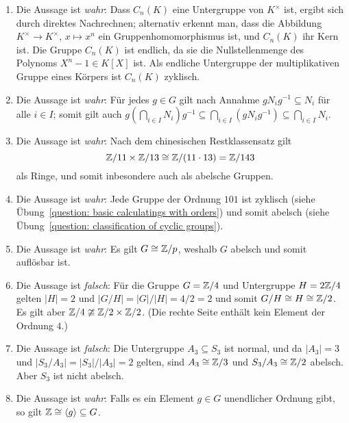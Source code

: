 \begin{solution}
  \begin{enumerate}
    \item
      Die Aussage ist \emph{wahr}:
      Dass $C_n(K)$ eine Untergruppe von $K^\times$ ist, ergibt sich durch direktes Nachrechnen;
      alternativ erkennt man, dass die Abbildung $K^\times \to K^\times$, $x \mapsto x^n$ ein Gruppenhomomorphismus ist, und $C_n(K)$ ihr Kern ist.
      Die Gruppe $C_n(K)$ ist endlich, da sie die Nullstellenmenge des Polynoms $X^n - 1 \in K[X]$ ist.
      Als endliche Untergruppe der multiplikativen Gruppe eines Körpers ist $C_n(K)$ zyklisch.
    \item
      Die Aussage ist \emph{wahr}:
      Für jedes $g \in G$ gilt nach Annahme $g N_i g^{-1} \subseteq N_i$ für alle $i \in I$;
      somit gilt auch $g \left( \bigcap_{i \in I} N_i \right) g^{-1} \subseteq \bigcap_{i \in I} (g N_i g^{-1}) \subseteq \bigcap_{i \in I} N_i$.
    \item
      Die Aussage ist \emph{wahr}:
      Nach dem chinesischen Restklassensatz gilt
      \[
              \mathbb{Z}/11 \times \mathbb{Z}/13
        \cong \mathbb{Z}/(11 \cdot 13)
        =     \mathbb{Z}/143
      \]
      als Ringe, und somit inbesondere auch als abelsche Gruppen.
    \item
      Die Aussage ist \emph{wahr}:
      Jede Gruppe der Ordnung $101$ ist zyklisch (siehe Übung~\ref{question: basic calculatings with orders}) und somit abelsch (siehe Übung~\ref{question: classification of cyclic groups}).
    \item
      Die Aussage ist \emph{wahr}:
      Es gilt $G \cong \mathbb{Z}/p$, weshalb $G$ abelsch und somit auflösbar ist.
    \item
      Die Aussage ist \emph{falsch}:
      Für die Gruppe $G = \mathbb{Z}/4$ und Untergruppe $H = 2\mathbb{Z}/4$ gelten $|H| = 2$ und $|G/H| = |G|/|H| = 4/2 = 2$ und somit $G/H \cong H \cong \mathbb{Z}/2$.
      Es gilt aber $\mathbb{Z}/4 \ncong \mathbb{Z}/2 \times \mathbb{Z}/2$.
      (Die rechte Seite enthält kein Element der Ordnung $4$.)
    \item
      Die Aussage ist \emph{falsch}:
      Die Untergruppe $A_3 \subseteq S_3$ ist normal, und da $|A_3| = 3$ und $|S_3/A_3| = |S_3|/|A_3| = 2$ gelten, sind $A_3 \cong \mathbb{Z}/3$ und $S_3/A_3 \cong \mathbb{Z}/2$ abelsch.
      Aber $S_3$ ist nicht abelsch.
    \item
      Die Aussage ist \emph{wahr}:
      Falls es ein Element $g \in G$ unendlicher Ordnung gibt, so gilt $\mathbb{Z} \cong \langle g\rangle \subseteq G$.

\end{enumerate}
\end{solution}

